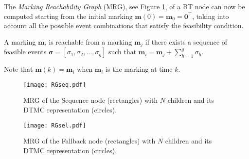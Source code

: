 
The \emph{Marking Reachability Graph} (MRG)\label{definition:RG}, see Figure \ref{stoch:app.fig.seq},
 of a BT node can now be computed starting from the initial marking $\mathbf{m}(0)=\mathbf{m}_0=\mathbf{0}^\top$, taking into account all the possible event combinations that satisfy the feasibility condition.

\begin{definition}
A marking $\mathbf{m}_{i}$ is reachable from a marking $\mathbf{m}_j$ if there exists a sequence of feasible events $\boldsymbol{\sigma}=[\sigma_1,\sigma_2,\ldots,\sigma_g]$ such that $\mathbf{m}_{i}= \mathbf{m}_{j} + \sum_{h=1}^g \sigma_h$.
\end{definition}
\begin{remark}
Note that $\mathbf{m}(k)=\mathbf{m}_i$ when $\mathbf{m}_i$ is the marking at time $k$.
\end{remark}
\begin{figure}[h]
\centering
\texttt{[image: RGseq.pdf]}
\caption{MRG of the Sequence node (rectangles) with $N$ children and its DTMC representation (circles).}
\label{stoch:app.fig.seq}
\end{figure}
\begin{figure}[h]
\centering
\texttt{[image: RGsel.pdf]}
\caption{MRG of the Fallback node (rectangles) with $N$ children and its DTMC representation (circles).}
\label{stoch:app.fig.sel}
\end{figure}

